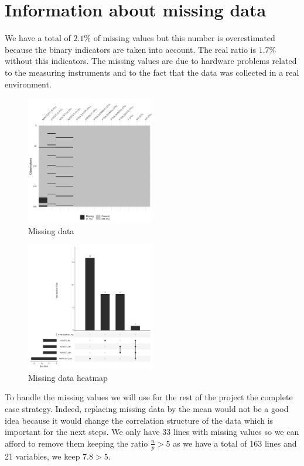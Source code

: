 \section{Information about missing data}
We have a total of $2.1\%$ of missing values but this number is overestimated because the binary indicators are taken into account. The real ratio is $1.7\%$
without this indicators.
The missing values are due to hardware problems related to the measuring instruments
and to the fact that the data was collected in a real environment.

\begin{figure}[H]
  \centering
  \includegraphics[width=0.5\textwidth]{figs/missing_values.png}
  \caption{Missing data}
  \label{fig:missing_data}
\end{figure}

\begin{figure}[H]
  \centering
  \includegraphics[width=0.5\textwidth]{figs/missing_values_heatmap.png}
  \caption{Missing data heatmap}
  \label{fig:missing_data_heatmap}
\end{figure}

To handle the missing values we will use for the rest of the project the complete case strategy.
Indeed, replacing missing data by the mean would not be a good idea because it would change the correlation structure of the data which is important for the next steps.
We only have 33 lines with missing values so we can afford to remove them keeping the ratio $\frac{n}{p} > 5$ as we have a total of 163 lines and 21 variables, we keep $7.8 > 5$.


